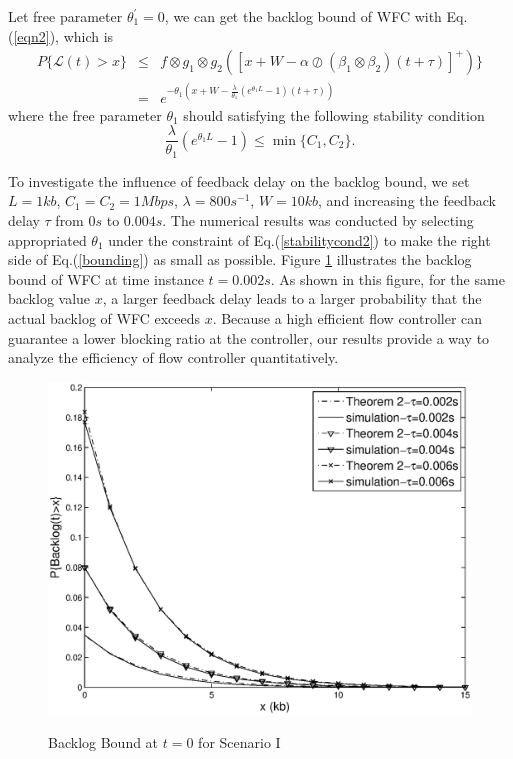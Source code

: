 \documentclass[12pt]{article}
\begin{document}
Let free parameter $\theta_1^\prime=0$, we can get the backlog bound of WFC with Eq.(\ref{eqn2}), which is
\begin{eqnarray}\label{bounding}
P\{\mathcal{L}(t)>x\}&\leq& f\otimes g_1\otimes g_2([x+W-\alpha\oslash(\beta_1\otimes\beta_2)(t+\tau)]^+)\}\nonumber\\
&=& e^{-\theta_1(x+W-\frac{\lambda}{\theta_1}(e^{\theta_1 L}-1)(t+\tau))}
\end{eqnarray}
where the free parameter $\theta_1$ should satisfying the following stability condition
\begin{equation}\label{stabilitycond2}
\frac{\lambda}{\theta_1}(e^{\theta_1 L}-1)\leq \min\{C_1,C_2\}.
\end{equation}

To investigate the influence of feedback delay on the backlog bound, we set $L=1kb$, $C_1=C_2=1Mbps$, $\lambda=800s^{-1}$, $W=10kb$, and increasing the feedback delay $\tau$ from $0s$ to $0.004s$. The numerical results was conducted by selecting appropriated $\theta_1$ under the constraint of Eq.(\ref{stabilitycond2}) to make the right side of Eq.(\ref{bounding}) as small as possible. Figure \ref{backlogtau} illustrates the backlog bound of WFC at time instance $t=0.002s$. As shown in this figure, for the same backlog value $x$, a larger feedback delay leads to a larger probability that the actual backlog of WFC exceeds $x$. Because a high efficient flow controller can guarantee a lower blocking ratio at the controller, our results  provide a way to analyze the efficiency of flow controller quantitatively.
\begin{figure}[bpt]
  \centering
  \includegraphics[scale=0.45]{figures/backlogtau.eps}\\
  \caption{Backlog Bound at $t=0$ for Scenario I}\label{backlogtau}
\end{figure}
\end{document}
